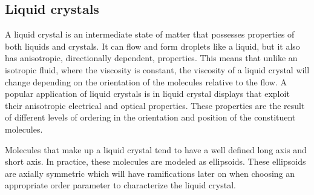 \documentclass[preprint, aps]{revtex4-1}
\begin{document}
\subsection*{Liquid crystals}
A liquid crystal is an intermediate state of matter that possesses properties of 
both liquids and crystals. It can flow and form droplets like a liquid, but it 
also has anisotropic, directionally dependent, properties. This means that 
unlike an isotropic fluid, where the viscosity is constant, the viscosity of a 
liquid crystal will change depending on the orientation of the molecules 
relative to the flow. A popular application of liquid crystals is in liquid 
crystal displays that exploit their anisotropic electrical and optical 
properties. These properties are the result of different levels of ordering in 
the orientation and position of the constituent molecules.

Molecules that make up a liquid crystal tend to have a well defined long axis 
and short axis. In practice, these molecules are modeled as ellipsoids. These 
ellipsoids are axially symmetric which will have ramifications later on when 
choosing an appropriate order parameter to characterize the liquid crystal. 
\end{document}
